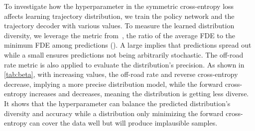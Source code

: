 \documentclass[10pt,twocolumn,letterpaper]{article}
\begin{document}
 To investigate how the hyperparameter  in the symmetric cross-entropy loss affects learning trajectory distribution, we train the policy network and the trajectory decoder with various  values. To measure the learned distribution diversity, we leverage the  metric from~\cite{park2020diverse}, \ie the ratio of the average FDE to the minimum FDE among  predictions (). A large  implies that predictions spread out while a small  ensures predictions not being arbitrarily stochastic. The off-road rate metric is also applied to evaluate the distribution's precision. As shown in \cref{tab:beta}, with increasing  values, the off-road rate and reverse cross-entropy decrease, implying a more precise distribution model, while the forward cross-entropy increases and  decreases, meaning the distribution is getting less diverse. It shows that the hyperparameter  can balance the predicted distribution's diversity and accuracy while a distribution only minimizing the forward cross-entropy can cover the data well but will produce implausible samples.

\begin{table}
    \centering
{}
	\vspace{-0.2cm}
	\caption{Effect of  and reward in trajectory distribution forecasting based on the predicted OGMs.}
	\label{tab:beta}
\end{table}
\end{document}
